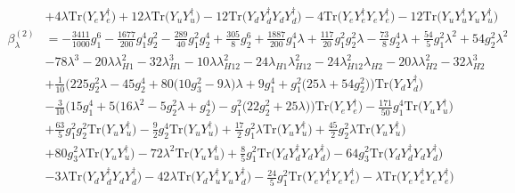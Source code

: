 {\begin{align}
 &+4 \lambda \mbox{Tr}\Big({Y_e  Y_{e}^{\dagger}}\Big) +12 \lambda \mbox{Tr}\Big({Y_u  Y_{u}^{\dagger}}\Big) -12 \mbox{Tr}\Big({Y_d  Y_{d}^{\dagger}  Y_d  Y_{d}^{\dagger}}\Big) -4 \mbox{Tr}\Big({Y_e  Y_{e}^{\dagger}  Y_e  Y_{e}^{\dagger}}\Big) -12 \mbox{Tr}\Big({Y_u  Y_{u}^{\dagger}  Y_u  Y_{u}^{\dagger}}\Big) \\ 
\beta_{\lambda}^{(2)} & =  
-\frac{3411}{1000} g_{1}^{6} -\frac{1677}{200} g_{1}^{4} g_{2}^{2} -\frac{289}{40} g_{1}^{2} g_{2}^{4} +\frac{305}{8} g_{2}^{6} +\frac{1887}{200} g_{1}^{4} \lambda +\frac{117}{20} g_{1}^{2} g_{2}^{2} \lambda -\frac{73}{8} g_{2}^{4} \lambda +\frac{54}{5} g_{1}^{2} \lambda^{2} +54 g_{2}^{2} \lambda^{2} \nonumber \\ 
 &-78 \lambda^{3} -20 \lambda \lambda_{H1}^{2} -32 \lambda_{H1}^{3} -10 \lambda \lambda_{H12}^{2} -24 \lambda_{H1} \lambda_{H12}^{2} -24 \lambda_{H12}^{2} \lambda_{H2} -20 \lambda \lambda_{H2}^{2} -32 \lambda_{H2}^{3} \nonumber \\ 
 &+\frac{1}{10} \Big(225 g_{2}^{2} \lambda  -45 g_{2}^{4}  + 80 \Big(10 g_{3}^{2}  -9 \lambda \Big)\lambda  + 9 g_{1}^{4}  + g_{1}^{2} \Big(25 \lambda  + 54 g_{2}^{2} \Big)\Big)\mbox{Tr}\Big({Y_d  Y_{d}^{\dagger}}\Big) \nonumber \\ 
 &-\frac{3}{10} \Big(15 g_{1}^{4}  + 5 \Big(16 \lambda^{2}  -5 g_{2}^{2} \lambda  + g_{2}^{4}\Big) - g_{1}^{2} \Big(22 g_{2}^{2}  + 25 \lambda \Big)\Big)\mbox{Tr}\Big({Y_e  Y_{e}^{\dagger}}\Big) -\frac{171}{50} g_{1}^{4} \mbox{Tr}\Big({Y_u  Y_{u}^{\dagger}}\Big) \nonumber \\ 
 &+\frac{63}{5} g_{1}^{2} g_{2}^{2} \mbox{Tr}\Big({Y_u  Y_{u}^{\dagger}}\Big) -\frac{9}{2} g_{2}^{4} \mbox{Tr}\Big({Y_u  Y_{u}^{\dagger}}\Big) +\frac{17}{2} g_{1}^{2} \lambda \mbox{Tr}\Big({Y_u  Y_{u}^{\dagger}}\Big) +\frac{45}{2} g_{2}^{2} \lambda \mbox{Tr}\Big({Y_u  Y_{u}^{\dagger}}\Big) \nonumber \\ 
 &+80 g_{3}^{2} \lambda \mbox{Tr}\Big({Y_u  Y_{u}^{\dagger}}\Big) -72 \lambda^{2} \mbox{Tr}\Big({Y_u  Y_{u}^{\dagger}}\Big) +\frac{8}{5} g_{1}^{2} \mbox{Tr}\Big({Y_d  Y_{d}^{\dagger}  Y_d  Y_{d}^{\dagger}}\Big) -64 g_{3}^{2} \mbox{Tr}\Big({Y_d  Y_{d}^{\dagger}  Y_d  Y_{d}^{\dagger}}\Big) \nonumber \\ 
 &-3 \lambda \mbox{Tr}\Big({Y_d  Y_{d}^{\dagger}  Y_d  Y_{d}^{\dagger}}\Big) -42 \lambda \mbox{Tr}\Big({Y_d  Y_{u}^{\dagger}  Y_u  Y_{d}^{\dagger}}\Big) -\frac{24}{5} g_{1}^{2} \mbox{Tr}\Big({Y_e  Y_{e}^{\dagger}  Y_e  Y_{e}^{\dagger}}\Big) - \lambda \mbox{Tr}\Big({Y_e  Y_{e}^{\dagger}  Y_e  Y_{e}^{\dagger}}\Big) \nonumber \\ 

\end{align}}
